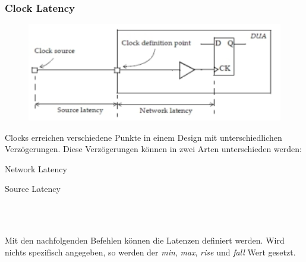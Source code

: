 \subsubsection{Clock Latency}
\begin{minipage}{0.5\textwidth}
    \begin{figure}[H]
        \includegraphics[width=1\textwidth]{images/clock_latency.png}
    \end{figure}
\end{minipage}
\hfill
\begin{minipage}{0.45\textwidth}
    Clocks erreichen verschiedene Punkte in einem Design mit unterschiedlichen Verzögerungen. Diese Verzögerungen können in zwei Arten unterschieden werden:
    \begin{compactitem}
        \item Network Latency
        \item Source Latency
    \end{compactitem} \ \\ \ \\
\end{minipage}

Mit den nachfolgenden Befehlen können die Latenzen definiert werden. Wird nichts spezifisch angegeben, so werden der  \textit{min}, \textit{max}, \textit{rise} und \textit{fall} Wert gesetzt.


